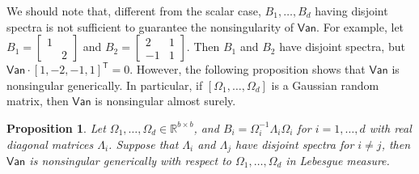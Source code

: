 \documentclass{article}
\newtheorem{proposition}{Proposition}%
\newcommand{\Ttran}{\mathsf{T}}
\newcommand{\van}{\mathsf{Van}}
\newcommand{\R}{\mathbb{R}}
\begin{document}
We should note that, different from the scalar case, $B_{1},\dotsc,B_{d}$ having disjoint spectra is not sufficient to guarantee the nonsingularity of $\van$. For example, let $B_{1}=\begin{bmatrix}
    1 & \\ & 2
\end{bmatrix}$ and $B_{2}=\begin{bmatrix}
    2 & 1\\ -1 & 1
\end{bmatrix}$. Then $B_{1}$ and $B_{2}$ have disjoint spectra, but $\van\cdot[1,-2,-1,1]^{\Ttran}=0$. However, the following proposition shows that $\van$ is nonsingular generically. In particular, if $[\Omega_{1},\dotsc,\Omega_{d}]$ is a Gaussian random matrix, then $\van$ is nonsingular almost surely.

\begin{proposition}
    \label{prop:nonsingular}
    Let $\Omega_{1},\dotsc,\Omega_{d}\in\R^{b\times b}$, and $B_{i}=\Omega_{i}^{-1}\Lambda_{i}\Omega_{i}$ for $i=1,\dotsc,d$ with real diagonal matrices $\Lambda_{i}$. Suppose that $\Lambda_{i}$ and $\Lambda_{j}$ have disjoint spectra for $i\neq j$, then $\van$ is nonsingular generically with respect to $\Omega_{1},\dotsc,\Omega_{d}$ in Lebesgue measure.
\end{proposition}
\end{document}
